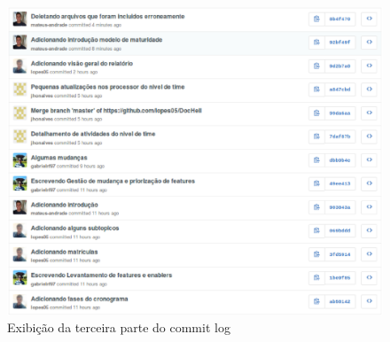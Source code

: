 \begin{figure}[!htpb]
	\centering
	\includegraphics[scale=0.6]{figuras/cronograma/3}
	\caption{Exibição da terceira parte do commit log}
\end{figure}